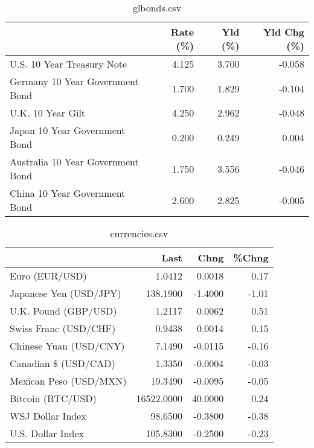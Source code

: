 \documentclass{article}%
\begin{document}
%


\begin{table}[htbp]%
\caption{glbonds.csv}%
\centering%
\begin{adjustbox}{width=1\textwidth}%
\begin{tabular}{lrrr}
\toprule
                                  &  Rate (\%) &  Yld (\%) &  Yld Chg (\%) \\
\midrule
       U.S. 10 Year Treasury Note &     4.125 &    3.700 &       -0.058 \\
  Germany 10 Year Government Bond &     1.700 &    1.829 &       -0.104 \\
                U.K. 10 Year Gilt &     4.250 &    2.962 &       -0.048 \\
    Japan 10 Year Government Bond &     0.200 &    0.249 &        0.004 \\
Australia 10 Year Government Bond &     1.750 &    3.556 &       -0.046 \\
    China 10 Year Government Bond &     2.600 &    2.825 &       -0.005 \\
\bottomrule
\end{tabular}
%
\end{adjustbox}%
\end{table}

%


\begin{table}[htbp]%
\caption{currencies.csv}%
\centering%
\begin{adjustbox}{width=1\textwidth}%
\begin{tabular}{lrrr}
\toprule
                       &       Last &    Chng &  \%Chng \\
\midrule
        Euro (EUR/USD) &     1.0412 &  0.0018 &   0.17 \\
Japanese Yen (USD/JPY) &   138.1900 & -1.4000 &  -1.01 \\
  U.K. Pound (GBP/USD) &     1.2117 &  0.0062 &   0.51 \\
 Swiss Franc (USD/CHF) &     0.9438 &  0.0014 &   0.15 \\
Chinese Yuan (USD/CNY) &     7.1490 & -0.0115 &  -0.16 \\
  Canadian \$ (USD/CAD) &     1.3350 & -0.0004 &  -0.03 \\
Mexican Peso (USD/MXN) &    19.3490 & -0.0095 &  -0.05 \\
     Bitcoin (BTC/USD) & 16522.0000 & 40.0000 &   0.24 \\
      WSJ Dollar Index &    98.6500 & -0.3800 &  -0.38 \\
     U.S. Dollar Index &   105.8300 & -0.2500 &  -0.23 \\
\bottomrule
\end{tabular}
%
\end{adjustbox}%
\end{table}

%
\end{document}
